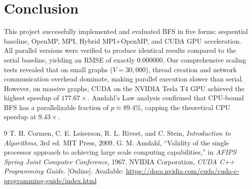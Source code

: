 \documentclass[12pt, a4paper]{article}
\begin{document}
\section{Conclusion}
This project successfully implemented and evaluated BFS in five forms: sequential baseline, OpenMP, MPI, Hybrid MPI+OpenMP, and CUDA GPU acceleration. All parallel versions were verified to produce identical results compared to the serial baseline, yielding an RMSE of exactly $0.000000$. Our comprehensive scaling tests revealed that on small graphs ($V=30,000$), thread creation and network communication overhead dominate, making parallel execution slower than serial. However, on massive graphs, CUDA on the NVIDIA Tesla T4 GPU achieved the highest speedup of $177.67\times$. Amdahl's Law analysis confirmed that CPU-bound BFS has a parallelizable fraction of $p \approx 89.4\%$, capping the theoretical CPU speedup at $9.43\times$.

\newpage
\begin{thebibliography}{9}
T. H. Cormen, C. E. Leiserson, R. L. Rivest, and C. Stein, \textit{Introduction to Algorithms}, 3rd ed. MIT Press, 2009.
G. M. Amdahl, ``Validity of the single processor approach to achieving large scale computing capabilities,'' in \textit{AFIPS Spring Joint Computer Conference}, 1967.
NVIDIA Corporation, \textit{CUDA C++ Programming Guide}. [Online]. Available: \url{https://docs.nvidia.com/cuda/cuda-c-programming-guide/index.html}
\end{thebibliography}
\end{document}
